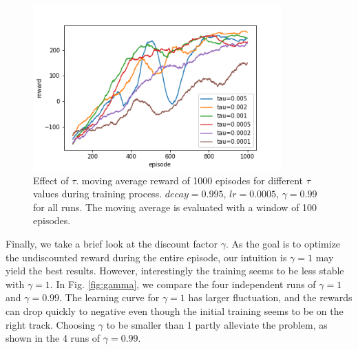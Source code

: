 \documentclass[conference]{IEEEtran}
\begin{document}
\begin{figure}
	\includegraphics[height=2.5in]{figures/tau.png} 
	\caption{Effect of $\tau$. moving average reward of 1000 episodes for different $\tau$ values during training process. $decay=0.995$, $lr=0.0005$, $\gamma=0.99$ for all runs. The moving average is evaluated with a window of 100 episodes.}
	\label{fig:tau}
\end{figure}
	
Finally, we take a brief look at the discount factor $\gamma$. As the goal is to optimize the undiscounted reward during the entire episode, our intuition is $\gamma=1$ may yield the best results. However, interestingly the training seems to be less stable with $\gamma=1$. In Fig. \ref{fig:gamma}, we compare the four independent runs of $\gamma=1$ and $\gamma=0.99$. The learning curve for $\gamma=1$ has larger fluctuation, and the rewards can drop quickly to negative even though the initial training seems to be on the right track. Choosing $\gamma$ to be smaller than 1 partly alleviate the problem, as shown in the 4 runs of $\gamma=0.99$.
\end{document}
